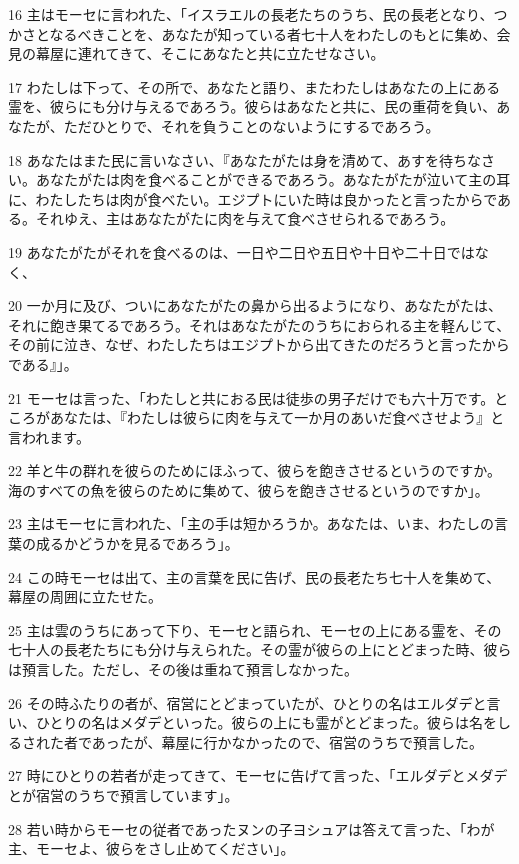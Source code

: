 \par 16 主はモーセに言われた、「イスラエルの長老たちのうち、民の長老となり、つかさとなるべきことを、あなたが知っている者七十人をわたしのもとに集め、会見の幕屋に連れてきて、そこにあなたと共に立たせなさい。
\par 17 わたしは下って、その所で、あなたと語り、またわたしはあなたの上にある霊を、彼らにも分け与えるであろう。彼らはあなたと共に、民の重荷を負い、あなたが、ただひとりで、それを負うことのないようにするであろう。
\par 18 あなたはまた民に言いなさい、『あなたがたは身を清めて、あすを待ちなさい。あなたがたは肉を食べることができるであろう。あなたがたが泣いて主の耳に、わたしたちは肉が食べたい。エジプトにいた時は良かったと言ったからである。それゆえ、主はあなたがたに肉を与えて食べさせられるであろう。
\par 19 あなたがたがそれを食べるのは、一日や二日や五日や十日や二十日ではなく、
\par 20 一か月に及び、ついにあなたがたの鼻から出るようになり、あなたがたは、それに飽き果てるであろう。それはあなたがたのうちにおられる主を軽んじて、その前に泣き、なぜ、わたしたちはエジプトから出てきたのだろうと言ったからである』」。
\par 21 モーセは言った、「わたしと共におる民は徒歩の男子だけでも六十万です。ところがあなたは、『わたしは彼らに肉を与えて一か月のあいだ食べさせよう』と言われます。
\par 22 羊と牛の群れを彼らのためにほふって、彼らを飽きさせるというのですか。海のすべての魚を彼らのために集めて、彼らを飽きさせるというのですか」。
\par 23 主はモーセに言われた、「主の手は短かろうか。あなたは、いま、わたしの言葉の成るかどうかを見るであろう」。
\par 24 この時モーセは出て、主の言葉を民に告げ、民の長老たち七十人を集めて、幕屋の周囲に立たせた。
\par 25 主は雲のうちにあって下り、モーセと語られ、モーセの上にある霊を、その七十人の長老たちにも分け与えられた。その霊が彼らの上にとどまった時、彼らは預言した。ただし、その後は重ねて預言しなかった。
\par 26 その時ふたりの者が、宿営にとどまっていたが、ひとりの名はエルダデと言い、ひとりの名はメダデといった。彼らの上にも霊がとどまった。彼らは名をしるされた者であったが、幕屋に行かなかったので、宿営のうちで預言した。
\par 27 時にひとりの若者が走ってきて、モーセに告げて言った、「エルダデとメダデとが宿営のうちで預言しています」。
\par 28 若い時からモーセの従者であったヌンの子ヨシュアは答えて言った、「わが主、モーセよ、彼らをさし止めてください」。
